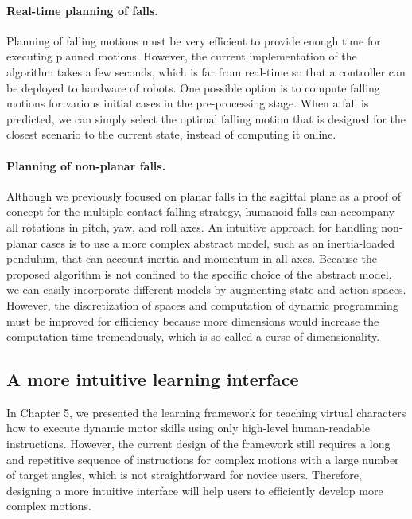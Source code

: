\paragraph{Real-time planning of falls.}
Planning of falling motions must be very efficient to provide enough time for
executing planned motions. 
However, the current implementation of the algorithm takes a few seconds, which
is far from real-time so that a controller can be deployed to hardware of robots.
One possible option is to compute falling motions for
various initial cases in the pre-processing stage.
When a fall is predicted, we can simply select the optimal falling motion
that is designed for the closest scenario to the current state,
instead of computing it online.

\paragraph{Planning of non-planar falls.}
Although we previously focused on planar falls in the sagittal plane as a proof
of concept for the multiple contact falling strategy, humanoid falls
can accompany all rotations in pitch, yaw, and roll axes.
An intuitive approach for handling non-planar cases is to use a more complex
abstract model, such as an inertia-loaded pendulum, that can account inertia
and momentum in all axes.
Because the proposed algorithm is not confined to the specific choice of the
abstract model, we can easily incorporate different models by
augmenting state and action spaces. 
However, the discretization of spaces and computation of dynamic programming
must be improved for efficiency because more dimensions would increase the
computation time tremendously, which is so called a curse of dimensionality. 

\subsection{A more intuitive learning interface}

In Chapter 5, we presented the learning framework for teaching
virtual characters how to execute dynamic motor skills using only high-level
human-readable instructions. 
However, the current design of the framework still requires a long and
repetitive sequence of instructions for complex motions with a large 
number of target angles, which is not straightforward for novice users. 
Therefore, designing a more intuitive interface will help users to 
efficiently develop more complex motions.

